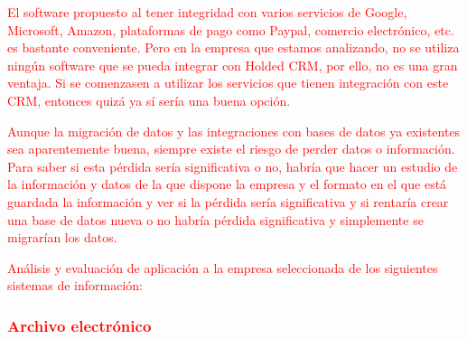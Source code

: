 \documentclass{article}
\begin{document}
\textcolor{Red}{El software propuesto al tener integridad con varios servicios de Google, Microsoft, Amazon, plataformas de pago como Paypal, comercio electrónico, etc. es bastante conveniente. Pero en la empresa que estamos analizando, no se utiliza ningún software que se pueda integrar con Holded CRM, por ello, no es una gran ventaja. Si se comenzasen a utilizar los servicios que tienen integración con este CRM, entonces quizá ya sí sería una buena opción. }

\textcolor{Red}{Aunque la migración de datos y las integraciones con bases de datos ya existentes sea aparentemente buena, siempre existe el riesgo de perder datos o información. Para saber si esta pérdida sería significativa o no, habría que hacer un estudio de la información y datos de la que dispone la empresa y el formato en el que está guardada la información y ver si la pérdida sería significativa y si rentaría crear una base de datos nueva o no habría pérdida significativa y simplemente se migrarían los datos.}

\textcolor{Red}{Análisis y evaluación de aplicación a la empresa seleccionada de los siguientes sistemas de información:}

\subsubsection{\textcolor{Red}{Archivo electrónico}}
\end{document}
